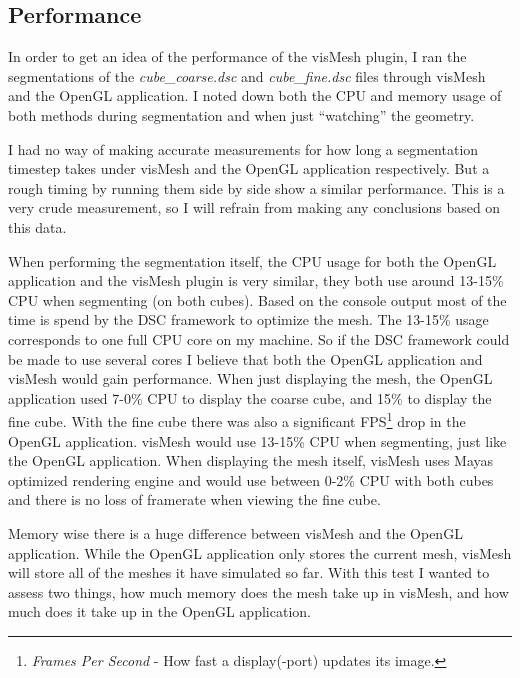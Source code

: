 
\subsection{Performance}
In order to get an idea of the performance of the visMesh plugin, I ran the
segmentations of the \textit{cube\_coarse.dsc} and \textit{cube\_fine.dsc} files
through visMesh and the OpenGL application. I noted down both the CPU and memory
usage of both methods during segmentation and when just ``watching'' the
geometry.

I had no way of making accurate measurements for how long a segmentation
timestep takes under visMesh and the OpenGL application respectively. But a
rough timing by running them side by side show a similar performance. This is a
very crude measurement, so I will refrain from making any conclusions based on
this data.

When performing the segmentation itself, the CPU usage for both the OpenGL
application and the visMesh plugin is very similar, they both use around 13-15\%
CPU when segmenting (on both cubes). Based on the console output most of the
time is spend by the DSC framework to optimize the mesh. The 13-15\% usage
corresponds to one full CPU core on my machine. So if the DSC framework could be
made to use several cores I believe that both the OpenGL application and visMesh
would gain performance. When just displaying the mesh, the OpenGL application
used 7-0\% CPU to display the coarse cube, and 15\% to display the fine cube.
With the fine cube there was also a significant FPS\footnote{\textit{Frames Per
Second} - How fast a display(-port) updates its image.} drop in the OpenGL
application. visMesh would use 13-15\% CPU when segmenting, just like the OpenGL
application. When displaying the mesh itself, visMesh uses Mayas optimized
rendering engine and would use between 0-2\% CPU with both cubes and there is no
loss of framerate when viewing the fine cube.

Memory wise there is a huge difference between visMesh and the OpenGL
application. While the OpenGL application only stores the current mesh, visMesh
will store all of the meshes it have simulated so far. With this test I wanted to
assess two things, how much memory does the mesh take up in visMesh, and how
much does it take up in the OpenGL application.

